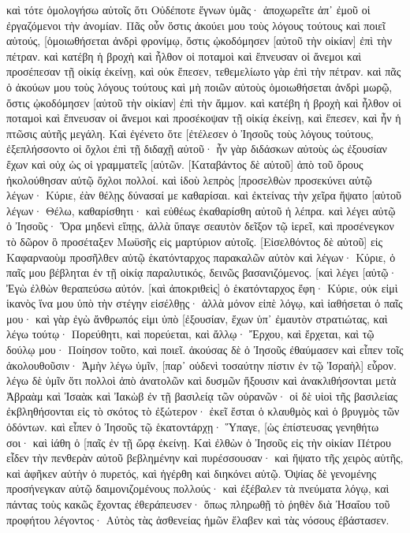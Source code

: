 καὶ τότε ὁμολογήσω αὐτοῖς ὅτι Οὐδέποτε ἔγνων ὑμᾶς· ἀποχωρεῖτε ἀπ᾽ ἐμοῦ οἱ ἐργαζόμενοι τὴν ἀνομίαν. 
Πᾶς οὖν ὅστις ἀκούει μου τοὺς λόγους τούτους καὶ ποιεῖ αὐτούς, [ὁμοιωθήσεται ἀνδρὶ φρονίμῳ, ὅστις ᾠκοδόμησεν [αὐτοῦ τὴν οἰκίαν] ἐπὶ τὴν πέτραν. 
καὶ κατέβη ἡ βροχὴ καὶ ἦλθον οἱ ποταμοὶ καὶ ἔπνευσαν οἱ ἄνεμοι καὶ προσέπεσαν τῇ οἰκίᾳ ἐκείνῃ, καὶ οὐκ ἔπεσεν, τεθεμελίωτο γὰρ ἐπὶ τὴν πέτραν. 
καὶ πᾶς ὁ ἀκούων μου τοὺς λόγους τούτους καὶ μὴ ποιῶν αὐτοὺς ὁμοιωθήσεται ἀνδρὶ μωρῷ, ὅστις ᾠκοδόμησεν [αὐτοῦ τὴν οἰκίαν] ἐπὶ τὴν ἄμμον. 
καὶ κατέβη ἡ βροχὴ καὶ ἦλθον οἱ ποταμοὶ καὶ ἔπνευσαν οἱ ἄνεμοι καὶ προσέκοψαν τῇ οἰκίᾳ ἐκείνῃ, καὶ ἔπεσεν, καὶ ἦν ἡ πτῶσις αὐτῆς μεγάλη. 
Καὶ ἐγένετο ὅτε [ἐτέλεσεν ὁ Ἰησοῦς τοὺς λόγους τούτους, ἐξεπλήσσοντο οἱ ὄχλοι ἐπὶ τῇ διδαχῇ αὐτοῦ· 
ἦν γὰρ διδάσκων αὐτοὺς ὡς ἐξουσίαν ἔχων καὶ οὐχ ὡς οἱ γραμματεῖς [αὐτῶν. 
[Καταβάντος δὲ αὐτοῦ] ἀπὸ τοῦ ὄρους ἠκολούθησαν αὐτῷ ὄχλοι πολλοί. 
καὶ ἰδοὺ λεπρὸς [προσελθὼν προσεκύνει αὐτῷ λέγων· Κύριε, ἐὰν θέλῃς δύνασαί με καθαρίσαι. 
καὶ ἐκτείνας τὴν χεῖρα ἥψατο [αὐτοῦ λέγων· Θέλω, καθαρίσθητι· καὶ εὐθέως ἐκαθαρίσθη αὐτοῦ ἡ λέπρα. 
καὶ λέγει αὐτῷ ὁ Ἰησοῦς· Ὅρα μηδενὶ εἴπῃς, ἀλλὰ ὕπαγε σεαυτὸν δεῖξον τῷ ἱερεῖ, καὶ προσένεγκον τὸ δῶρον ὃ προσέταξεν Μωϋσῆς εἰς μαρτύριον αὐτοῖς. 
[Εἰσελθόντος δὲ αὐτοῦ] εἰς Καφαρναοὺμ προσῆλθεν αὐτῷ ἑκατόνταρχος παρακαλῶν αὐτὸν 
καὶ λέγων· Κύριε, ὁ παῖς μου βέβληται ἐν τῇ οἰκίᾳ παραλυτικός, δεινῶς βασανιζόμενος. 
[καὶ λέγει [αὐτῷ· Ἐγὼ ἐλθὼν θεραπεύσω αὐτόν. 
[καὶ ἀποκριθεὶς] ὁ ἑκατόνταρχος ἔφη· Κύριε, οὐκ εἰμὶ ἱκανὸς ἵνα μου ὑπὸ τὴν στέγην εἰσέλθῃς· ἀλλὰ μόνον εἰπὲ λόγῳ, καὶ ἰαθήσεται ὁ παῖς μου· 
καὶ γὰρ ἐγὼ ἄνθρωπός εἰμι ὑπὸ [ἐξουσίαν, ἔχων ὑπ᾽ ἐμαυτὸν στρατιώτας, καὶ λέγω τούτῳ· Πορεύθητι, καὶ πορεύεται, καὶ ἄλλῳ· Ἔρχου, καὶ ἔρχεται, καὶ τῷ δούλῳ μου· Ποίησον τοῦτο, καὶ ποιεῖ. 
ἀκούσας δὲ ὁ Ἰησοῦς ἐθαύμασεν καὶ εἶπεν τοῖς ἀκολουθοῦσιν· Ἀμὴν λέγω ὑμῖν, [παρ᾽ οὐδενὶ τοσαύτην πίστιν ἐν τῷ Ἰσραὴλ] εὗρον. 
λέγω δὲ ὑμῖν ὅτι πολλοὶ ἀπὸ ἀνατολῶν καὶ δυσμῶν ἥξουσιν καὶ ἀνακλιθήσονται μετὰ Ἀβραὰμ καὶ Ἰσαὰκ καὶ Ἰακὼβ ἐν τῇ βασιλείᾳ τῶν οὐρανῶν· 
οἱ δὲ υἱοὶ τῆς βασιλείας ἐκβληθήσονται εἰς τὸ σκότος τὸ ἐξώτερον· ἐκεῖ ἔσται ὁ κλαυθμὸς καὶ ὁ βρυγμὸς τῶν ὀδόντων. 
καὶ εἶπεν ὁ Ἰησοῦς τῷ ἑκατοντάρχῃ· Ὕπαγε, [ὡς ἐπίστευσας γενηθήτω σοι· καὶ ἰάθη ὁ [παῖς ἐν τῇ ὥρᾳ ἐκείνῃ. 
Καὶ ἐλθὼν ὁ Ἰησοῦς εἰς τὴν οἰκίαν Πέτρου εἶδεν τὴν πενθερὰν αὐτοῦ βεβλημένην καὶ πυρέσσουσαν· 
καὶ ἥψατο τῆς χειρὸς αὐτῆς, καὶ ἀφῆκεν αὐτὴν ὁ πυρετός, καὶ ἠγέρθη καὶ διηκόνει αὐτῷ. 
Ὀψίας δὲ γενομένης προσήνεγκαν αὐτῷ δαιμονιζομένους πολλούς· καὶ ἐξέβαλεν τὰ πνεύματα λόγῳ, καὶ πάντας τοὺς κακῶς ἔχοντας ἐθεράπευσεν· 
ὅπως πληρωθῇ τὸ ῥηθὲν διὰ Ἠσαΐου τοῦ προφήτου λέγοντος· Αὐτὸς τὰς ἀσθενείας ἡμῶν ἔλαβεν καὶ τὰς νόσους ἐβάστασεν. 
